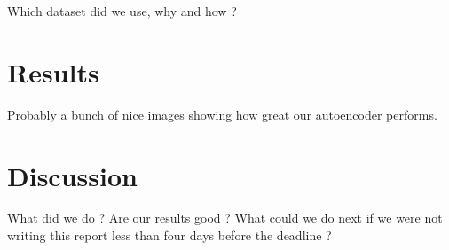 \documentclass[10pt,twocolumn,letterpaper]{article}
\begin{document}
Which dataset did we use, why and how ?

\section{Results}

Probably a bunch of nice images showing how great our autoencoder performs.

\section{Discussion} %

What did we do ? Are our results good ? What could we do next if we were not writing this report less than four days before the deadline ?

{\small


}
\end{document}
